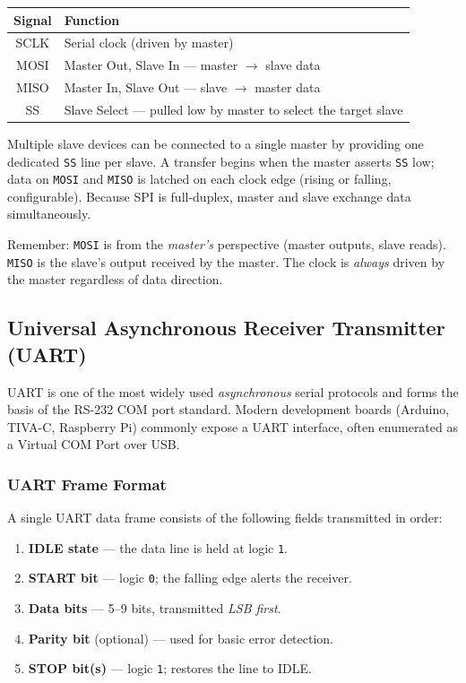 \documentclass[11pt, a4paper, notitlepage]{report}
\theoremstyle{definition}
\theoremstyle{remark}
\theoremstyle{definition}
\begin{document}
\begin{center}
\renewcommand{\arraystretch}{1.3}
\begin{tabular}{>{\ttfamily}cl}
  \toprule
  \normalfont Signal & Function \\
  \midrule
  SCLK  & Serial clock (driven by master) \\
  MOSI  & Master Out, Slave In — master $\rightarrow$ slave data \\
  MISO  & Master In, Slave Out — slave $\rightarrow$ master data \\
  SS    & Slave Select — pulled low by master to select the target slave \\
  \bottomrule
\end{tabular}
\end{center}

Multiple slave devices can be connected to a single master by providing one dedicated \texttt{SS} line per slave. A transfer begins when the master asserts \texttt{SS} low; data on \texttt{MOSI} and \texttt{MISO} is latched on each clock edge (rising or falling, configurable). Because SPI is full-duplex, master and slave exchange data simultaneously.

\begin{examtip}[title={Exam Tip: SPI Signal Names}]
  Remember: \texttt{MOSI} is from the \emph{master's} perspective (master outputs, slave reads). \texttt{MISO} is the slave's output received by the master. The clock is \emph{always} driven by the master regardless of data direction.
\end{examtip}

\subsection{Universal Asynchronous Receiver Transmitter (UART)}
\label{sec:uart}

UART is one of the most widely used \emph{asynchronous} serial protocols and forms the basis of the RS-232 COM port standard. Modern development boards (Arduino, TIVA-C, Raspberry Pi) commonly expose a UART interface, often enumerated as a Virtual COM Port over USB.

\subsubsection{UART Frame Format}

A single UART data frame consists of the following fields transmitted in order:

\begin{enumerate}
  \item \textbf{IDLE state} — the data line is held at logic \texttt{1}.
  \item \textbf{START bit} — logic \texttt{0}; the falling edge alerts the receiver.
  \item \textbf{Data bits} — 5–9 bits, transmitted \emph{LSB first}.
  \item \textbf{Parity bit} (optional) — used for basic error detection.
  \item \textbf{STOP bit(s)} — logic \texttt{1}; restores the line to IDLE.
\end{enumerate}
\end{document}
